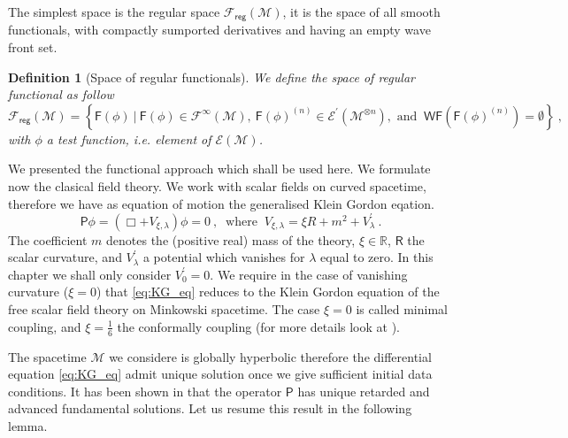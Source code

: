 \documentclass[10pt]{book}
\newcommand{\WF}{\mathsf{WF}}
\newcommand{\Ecal}{\mathcal{E}}
\newcommand{\Fcal}{\mathcal{F}}
\newcommand{\Mcal}{\mathcal{M}}
\newcommand{\Rbb}{\mathbb{R}}
\newcommand{\Fsf}{\mathsf{F}}
\newcommand{\Psf}{\mathsf{P}}
\newcommand{\Rsf}{\mathsf{R}}
\theoremstyle{break}
\newtheorem{definition}{Definition}
\begin{document}
The simplest space is the regular space $\mathcal{F}_\mathsf{reg}(\Mcal)$, it is the space of all smooth functionals, with compactly sumported derivatives and having an empty wave front set. %
%
\begin{definition}[Space of regular functionals]
We define the space of regular functional as follow
%
\begin{equation*}
\Fcal_{\mathsf{reg}}(\Mcal) = \left\{ \Fsf(\phi) \ \bigg| \ \Fsf(\phi) \in \Fcal^\infty(\Mcal), \ \Fsf(\phi)^{(n)} \in \Ecal^\prime(\Mcal^{\otimes n}), \mbox{ and } \ \WF(\Fsf(\phi)^{(n)}) = \emptyset \right\} \ ,
\end{equation*}
%
with $\phi$ a test function, i.e. element of $\Ecal(\Mcal)$. 
\end{definition}


\bigskip

We presented the functional approach which shall be used here. We formulate now the clasical field theory. We work with scalar fields on curved spacetime, therefore we have as equation of motion the generalised Klein Gordon eqation.%
%
\begin{equation*} 
\Psf \phi = \left( \Box + V_{\xi,\lambda} \right) \phi = 0 \ , \
\mbox{ where } \ V_{\xi,\lambda} = \xi R + m^2 + V^\prime_\lambda \ . 
\label{eq:KG_eq}
\end{equation*}
%
The coefficient $m$ denotes the (positive real) mass of the theory, $\xi \in \Rbb$, $\Rsf$ the scalar curvature, and $V^\prime_\lambda$ a potential which vanishes for $\lambda$ equal to zero. In this chapter we shall only consider $V^\prime_0=0$. We require in the case of vanishing curvature ($\xi=0$) that \eqref{eq:KG_eq} reduces to the Klein Gordon equation of the free scalar field theory on Minkowski spacetime. The case $\xi=0$ is called minimal coupling, and $\xi=\frac16$ the conformally coupling (for more details look at \cite{waldGR}).


\bigskip


The spacetime $\Mcal$ we considere is globally hyperbolic therefore the differential equation \eqref{eq:KG_eq} admit unique solution once we give sufficient initial data conditions. It has been shown in \cite{baer_wave_2008} that the operator $\Psf$ has unique retarded and advanced fundamental solutions. Let us resume this result in the following lemma.
\end{document}

